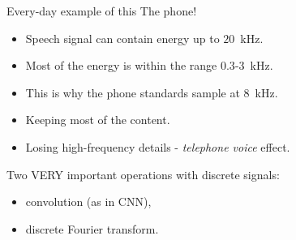 \documentclass[aspectratio=169]{beamer}
\begin{document}
\begin{frame}{Every-day example of this}
The phone!
 \begin{itemize}
  \item Speech signal can contain energy up to $20$~kHz.
  \item Most of the energy is within the range $0.3$-$3$~kHz.
  \item This is why the phone standards sample at $8$~kHz.
  \item Keeping most of the content.
  \item Losing high-frequency details - \textit{telephone voice} effect.
 \end{itemize}\vspace{4mm}
Two VERY important operations with discrete signals:
 \begin{itemize}
  \item convolution (as in CNN),
  \item discrete Fourier transform.
 \end{itemize}
\end{frame}
% 
% 
% 
% 
%  
\end{document}
